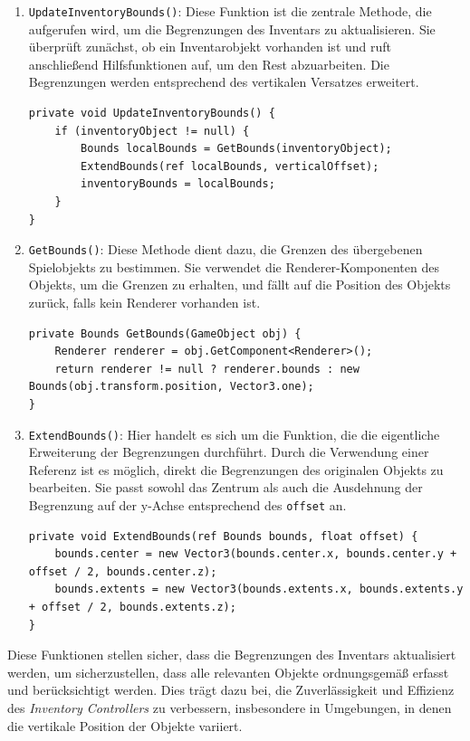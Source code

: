 \begin{enumerate}
    \item \texttt{UpdateInventoryBounds()}: Diese Funktion ist die zentrale Methode, die aufgerufen wird, um die Begrenzungen
    des Inventars zu aktualisieren. Sie überprüft zunächst, ob ein Inventarobjekt vorhanden ist und ruft anschließend
    Hilfsfunktionen auf, um den Rest abzuarbeiten. Die Begrenzungen werden entsprechend des vertikalen Versatzes erweitert.
    \begin{lstlisting}[language={[Sharp]C}]
private void UpdateInventoryBounds() {
    if (inventoryObject != null) {
        Bounds localBounds = GetBounds(inventoryObject);
        ExtendBounds(ref localBounds, verticalOffset);
        inventoryBounds = localBounds;
    }
}
    \end{lstlisting}

    \item \texttt{GetBounds()}: Diese Methode dient dazu, die Grenzen des übergebenen Spielobjekts zu bestimmen. Sie
    verwendet die Renderer-Komponenten des Objekts, um die Grenzen zu erhalten, und fällt auf die Position des Objekts
    zurück, falls kein Renderer vorhanden ist.
    \begin{lstlisting}[language={[Sharp]C}]
private Bounds GetBounds(GameObject obj) {
    Renderer renderer = obj.GetComponent<Renderer>();
    return renderer != null ? renderer.bounds : new Bounds(obj.transform.position, Vector3.one);
}
    \end{lstlisting}

    \item \texttt{ExtendBounds()}: Hier handelt es sich um die Funktion, die die eigentliche Erweiterung der Begrenzungen
    durchführt. Durch die Verwendung einer Referenz ist es möglich, direkt die Begrenzungen des originalen Objekts zu
    bearbeiten. Sie passt sowohl das Zentrum als auch die Ausdehnung der Begrenzung auf der y-Achse entsprechend des \texttt{offset} an.
    \begin{lstlisting}[language={[Sharp]C}]
private void ExtendBounds(ref Bounds bounds, float offset) {
    bounds.center = new Vector3(bounds.center.x, bounds.center.y + offset / 2, bounds.center.z);
    bounds.extents = new Vector3(bounds.extents.x, bounds.extents.y + offset / 2, bounds.extents.z);
}
    \end{lstlisting}
\end{enumerate}

Diese Funktionen stellen sicher, dass die Begrenzungen des Inventars aktualisiert werden, um sicherzustellen, dass alle
relevanten Objekte ordnungsgemäß erfasst und berücksichtigt werden. Dies trägt dazu bei, die Zuverlässigkeit und Effizienz
des \textit{Inventory Controllers} zu verbessern, insbesondere in Umgebungen, in denen die vertikale Position der Objekte
variiert.

